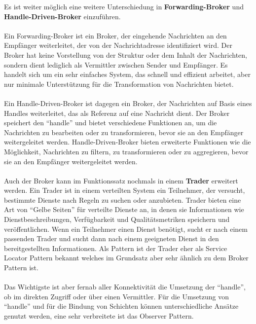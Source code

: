 \documentclass[../vs-script-first-v01.tex]{subfiles}
\begin{document}
Es ist weiter möglich eine weitere Unterschiedung in \textbf{Forwarding-Broker} und \textbf{Handle-Driven-Broker} einzuführen. 
\\\\
Ein Forwarding-Broker ist ein Broker, der eingehende Nachrichten an den Empfänger weiterleitet, der von der Nachrichtadresse identifiziert wird. Der Broker hat keine Vorstellung von der Struktur oder dem Inhalt der Nachrichten, sondern dient lediglich als Vermittler zwischen Sender und Empfänger. Es handelt sich um ein sehr einfaches System, das schnell und effizient arbeitet, aber nur minimale Unterstützung für die Transformation von Nachrichten bietet.
\\\\    
Ein Handle-Driven-Broker ist dagegen ein Broker, der Nachrichten auf Basis eines Handles weiterleitet, das als Referenz auf eine Nachricht dient. Der Broker speichert den \enquote{handle} und bietet verschiedene Funktionen an, um die Nachrichten zu bearbeiten oder zu transformieren, bevor sie an den Empfänger weitergeleitet werden. Handle-Driven-Broker bieten erweiterte Funktionen wie die Möglichkeit, Nachrichten zu filtern, zu transformieren oder zu aggregieren, bevor sie an den Empfänger weitergeleitet werden.
\\\\
Auch der Broker kann im Funktionssatz nochmals in einem \textbf{Trader} erweitert werden. Ein Trader ist in einem verteilten System ein Teilnehmer, der versucht, bestimmte Dienste nach Regeln zu suchen oder anzubieten. Trader bieten eine Art von \enquote{Gelbe Seiten} für verteilte Dienste an, in denen sie Informationen wie Dienstbeschreibungen, Verfügbarkeit und Qualitätsmetriken speichern und veröffentlichen. Wenn ein Teilnehmer einen Dienst benötigt, sucht er nach einem passenden Trader und sucht dann nach einem geeigneten Dienst in den bereitgestellten Informationen. Als Pattern ist der Trader eher als Service Locator Pattern bekannt welches im Grundsatz aber sehr ähnlich zu dem Broker Pattern ist. 
\\\\
Das Wichtigste ist aber fernab aller Konnektivität die Umsetzung der \enquote{handle}, ob im direkten Zugriff oder über einen Vermittler. Für die Umsetzung von \enquote{handle} und für die Bindung von Schichten können unterschiedliche Ansätze genutzt werden, eine sehr verbreitete ist das Observer Pattern. 
\end{document}
